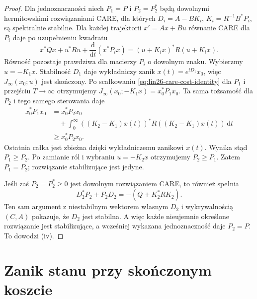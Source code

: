 \begin{proof}
Dla jednoznaczności
niech \(P_1=P\)
i \(P_2=P_2^*\)
będą dowolnymi
hermitowskimi
rozwiązaniami CARE,
dla których
\(D_i=A-BK_i\),
\(K_i=R^{-1}B^*P_i\),
są spektralnie stabilne.
Dla każdej trajektorii
\(x'=Ax+Bu\)
równanie CARE dla \(P_i\)
daje po uzupełnieniu
kwadratu
\[
 x^*Qx+u^*Ru+
    \frac{\mathrm d}{\mathrm dt}(x^*P_ix)
 =(u+K_ix)^*R(u+K_ix).
 \tag{26.6}\label{eq:lin26-care-cost-identity}
\]
Równość pozostaje prawdziwa
dla macierzy \(P_i\)
o dowolnym znaku.
Wybierzmy \(u=-K_1x\).
Stabilność \(D_1\)
daje wykładniczy zanik
\(x(t)=e^{tD_1}x_0\),
więc \(J_\infty(x_0;u)\)
jest skończony.
Po scałkowaniu
\eqref{eq:lin26-care-cost-identity}
dla \(P_1\)
i przejściu \(T\to\infty\)
otrzymujemy
\(J_\infty(x_0;-K_1x)=x_0^*P_1x_0\).
Ta sama tożsamość dla \(P_2\)
i tego samego sterowania daje
\[
 \begin{aligned}
 x_0^*P_1x_0
 &=x_0^*P_2x_0\\
 &\quad+\int_0^\infty
      ((K_2-K_1)x(t))^*
      R((K_2-K_1)x(t))
      \,\mathrm dt\\
 &\ge x_0^*P_2x_0.
 \end{aligned}
\]
Ostatnia całka jest zbieżna
dzięki wykładniczemu
zanikowi \(x(t)\).
Wynika stąd \(P_1\ge P_2\).
Po zamianie ról
i wybraniu \(u=-K_2x\)
otrzymujemy \(P_2\ge P_1\).
Zatem \(P_1=P_2\);
rozwiązanie stabilizujące
jest jedyne.

Jeśli zaś
\(P_2=P_2^*\ge0\)
jest dowolnym rozwiązaniem CARE,
to również spełnia
\[
 D_2^*P_2+P_2D_2
  =-(Q+K_2^*RK_2).
\]
Ten sam argument
z niestabilnym
wektorem własnym \(D_2\)
i wykrywalnością \((C,A)\)
pokazuje, że \(D_2\)
jest stabilna.
A więc każde
nieujemnie określone
rozwiązanie jest stabilizujące,
a wcześniej wykazana
jednoznaczność daje
\(P_2=P\).
To dowodzi (iv).
\end{proof}

\section{Zanik stanu przy skończonym koszcie}
\label{sec:lin26-decay}

